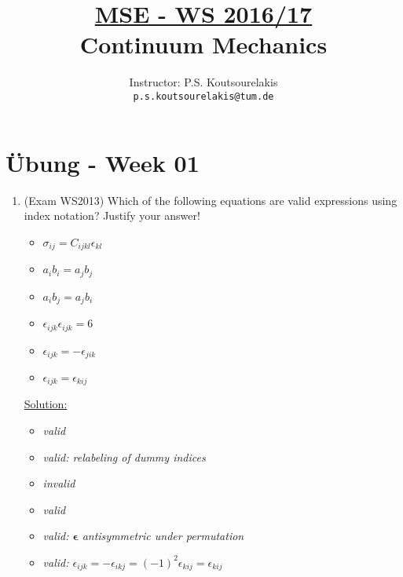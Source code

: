 \documentclass{article}
\title{\underline{MSE - WS 2016/17}\\
Continuum Mechanics}
\author{
Instructor: P.S. Koutsourelakis  \\
\texttt{p.s.koutsourelakis@tum.de} \\
}
\newcommand{\bi}{\begin{itemize}}
\newcommand{\ei}{\end{itemize}}
\newcommand{\bs}{\boldsymbol}
\begin{document}
\makeanontitle

%

\section*{\"Ubung - Week 01}


\begin{enumerate}
\item (Exam WS2013) Which of the following equations are valid expressions using index notation? Justify your answer!
\bi
\item $\sigma_{ij}=C_{ijkl} \epsilon_{kl}$
\item $a_i b_i = a_j b_j$
\item $a_i b_j = a_j b_i$
\item $\epsilon_{ijk}\epsilon_{ijk}=6$
\item $\epsilon_{ijk} = -\epsilon_{jik}$
\item $\epsilon_{ijk} = \epsilon_{kij}$
\ei

\underline{Solution:}
\bi
\item {} \textit{valid}
\item {} \textit{valid: relabeling of dummy indices}
\item {} \textit{invalid}
\item {} \textit{valid}
\item {} \textit{valid: $\bs \epsilon$ antisymmetric under
permutation}
\item {} \textit{valid: $\epsilon_{ijk} = - \epsilon_{ikj} =
(-1)^2 \epsilon_{kij} = \epsilon_{kij}$}
\ei


\end{enumerate}
\end{document}
